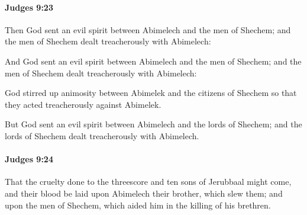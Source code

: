 		\paragraph{Judges 9:23} %
			\label{JUDGES-9-23}

			Then God sent an evil spirit between Abimelech and the men of Shechem; and the men of Shechem dealt treacherously with Abimelech:

			\begin{versebox}
					\item[BHS] 
					\item[ASV] And God sent an evil spirit between Abimelech and the men of Shechem; and the men of Shechem dealt treacherously with Abimelech:
					\item[NIV] God stirred up animosity between Abimelek and the citizens of Shechem so that they acted treacherously against Abimelek.
					\item[NRSV] But God sent an evil spirit between Abimelech and the lords of Shechem; and the lords of Shechem dealt treacherously with Abimelech.
			\end{versebox}

		\paragraph{Judges 9:24} %
			\label{JUDGES-9-24}

			That the cruelty done to the threescore and ten sons of Jerubbaal might come, and their blood be laid upon Abimelech their brother, which slew them; and upon the men of Shechem, which aided him in the killing of his brethren.

